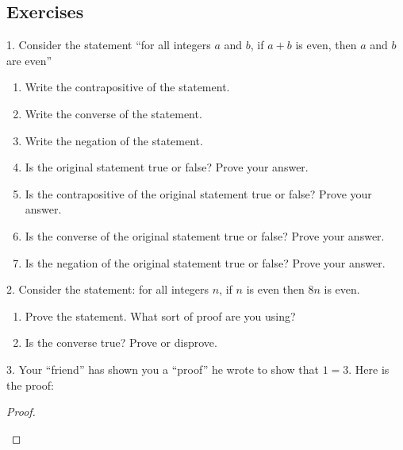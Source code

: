 \documentclass[10pt,]{book}
\theoremstyle{plain}
\theoremstyle{definition}
\numberwithin{equation}{chapter}
\begin{document}
\subsection[Exercises]{Exercises}\label{exercises_logic-proofs}
\begin{exerciselist}
\item[1.]\hypertarget{exercise-242}{}
          Consider the statement ``for all integers \(a\) and \(b\), if \(a + b\) is even, then \(a\) and \(b\) are even''
\leavevmode%
\begin{enumerate}[label=(\alph*)]
\item\hypertarget{li-664}{}
              Write the contrapositive of the statement.
\item\hypertarget{li-665}{}
              Write the converse of the statement.
\item\hypertarget{li-666}{}
              Write the negation of the statement.
\item\hypertarget{li-667}{}
              Is the original statement true or false? Prove your answer.
\item\hypertarget{li-668}{}
              Is the contrapositive of the original statement true or false? Prove your answer.
\item\hypertarget{li-669}{}
              Is the converse of the original statement true or false? Prove your answer.
\item\hypertarget{li-670}{}
              Is the negation of the original statement true or false? Prove your answer.
\end{enumerate}
\par\smallskip
\item[2.]\hypertarget{exercise-243}{}
          Consider the statement: for all integers \(n\), if \(n\) is even then \(8n\) is even.
\leavevmode%
\begin{enumerate}[label=(\alph*)]
\item\hypertarget{li-678}{}
              Prove the statement. What sort of proof are you using?
\item\hypertarget{li-679}{}
              Is the converse true? Prove or disprove.
\end{enumerate}
\par\smallskip
\item[3.]\hypertarget{exercise-244}{}
          Your ``friend'' has shown you a ``proof'' he wrote to show that \(1 = 3\). Here is the proof:
\begin{proof}\hypertarget{proof-23}{}


\end{proof}
\end{exerciselist}
\end{document}
